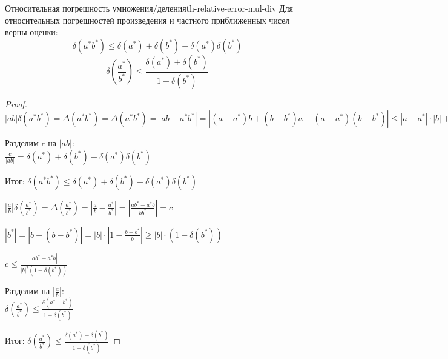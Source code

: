 \documentclass[14pt]{extarticle}
\begin{document}
        \begin{theorem}{Относительная погрешность умножения/деления}{th-relative-error-mul-div}
            Для относительных погрешностей произведения и частного приближенных чисел верны оценки:
            $$\delta(a^{*}b^{*}) \leq \delta(a^{*}) + \delta(b^{*}) + \delta(a^{*})\delta(b^{*})$$
            $$\delta(\frac{a^{*}}{b^{*}}) \leq \frac{\delta(a^{*}) + \delta(b^{*})}{1 - \delta(b^{*})}$$

            \begin{proof}
                $|ab|\delta(a^{*}b^{*}) = \Delta(a^{*}b^{*}) = \Delta(a^{*}b^{*}) = |ab - a^{*}b^{*}| = |(a - a^{*})b + (b - b^{*})a - (a - a^{*})(b - b^{*})| \leq |a - a^{*}| \cdot |b| + |b - b^{*}| \cdot |a| + |a - a^{*}| \cdot |b - b^{*}| = \Delta(a^{*})|b| + \Delta(b^{*})|a| + \Delta(a^{*})\Delta(b^{*}) = c$

                \vspace{\baselineskip}

                Разделим $c$ на $|ab|$:\\
                $\frac{c}{|ab|} = \delta(a^{*}) + \delta(b^{*}) + \delta(a^{*})\delta(b^{*})$
            
                \vspace{\baselineskip}

                Итог: $\delta(a^{*}b^{*}) \leq \delta(a^{*}) + \delta(b^{*}) + \delta(a^{*})\delta(b^{*})$

                \vspace{\baselineskip}

                $|\frac{a}{b}|\delta(\frac{a^{*}}{b^{*}}) = \Delta(\frac{a^{*}}{b^{*}}) = |\frac{a}{b} - \frac{a^{*}}{b^{*}}| = |\frac{ab^{*} - a^{*}b}{bb^{*}}| = c$

                \vspace{\baselineskip}

                $|b^{*}| = |b - (b - b^{*})| = |b| \cdot |1 - \frac{b - b^{*}}{b}| \geq |b| \cdot (1 - \delta(b^{*}))$

                \vspace{\baselineskip}

                $c \leq \frac{|ab^{*} - a^{*}b|}{|b|^{2}(1 - \delta(b^{*}))}$

                \vspace{\baselineskip}

                Разделим на $|\frac{a}{b}|$:\\
                $\delta(\frac{a^{*}}{b^{*}}) \leq \frac{\delta(a^{*} + b^{*})}{1 - \delta(b^{*})}$
                
                \vspace{\baselineskip}

                Итог: $\delta(\frac{a^{*}}{b^{*}}) \leq \frac{\delta(a^{*}) + \delta(b^{*})}{1 - \delta(b^{*})}$
            \end{proof}
        \end{theorem}
\end{document}
